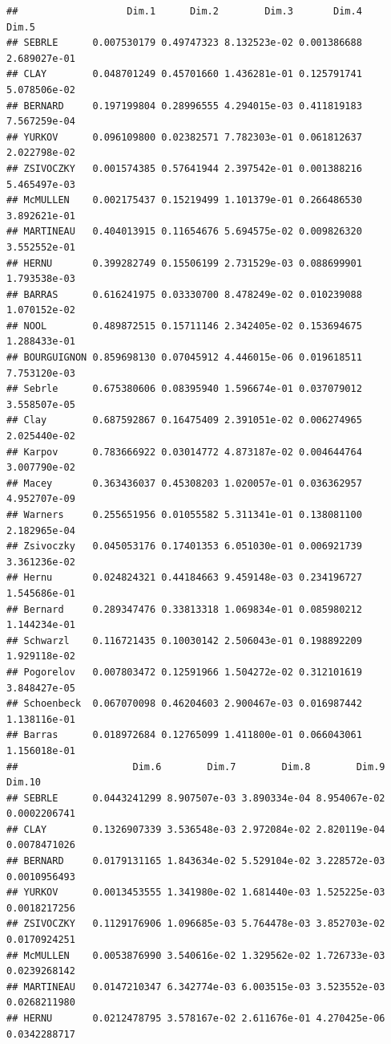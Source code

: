 \documentclass[
]{book}
\begin{document}
\begin{verbatim}
##                   Dim.1      Dim.2        Dim.3       Dim.4        Dim.5
## SEBRLE      0.007530179 0.49747323 8.132523e-02 0.001386688 2.689027e-01
## CLAY        0.048701249 0.45701660 1.436281e-01 0.125791741 5.078506e-02
## BERNARD     0.197199804 0.28996555 4.294015e-03 0.411819183 7.567259e-04
## YURKOV      0.096109800 0.02382571 7.782303e-01 0.061812637 2.022798e-02
## ZSIVOCZKY   0.001574385 0.57641944 2.397542e-01 0.001388216 5.465497e-03
## McMULLEN    0.002175437 0.15219499 1.101379e-01 0.266486530 3.892621e-01
## MARTINEAU   0.404013915 0.11654676 5.694575e-02 0.009826320 3.552552e-01
## HERNU       0.399282749 0.15506199 2.731529e-03 0.088699901 1.793538e-03
## BARRAS      0.616241975 0.03330700 8.478249e-02 0.010239088 1.070152e-02
## NOOL        0.489872515 0.15711146 2.342405e-02 0.153694675 1.288433e-01
## BOURGUIGNON 0.859698130 0.07045912 4.446015e-06 0.019618511 7.753120e-03
## Sebrle      0.675380606 0.08395940 1.596674e-01 0.037079012 3.558507e-05
## Clay        0.687592867 0.16475409 2.391051e-02 0.006274965 2.025440e-02
## Karpov      0.783666922 0.03014772 4.873187e-02 0.004644764 3.007790e-02
## Macey       0.363436037 0.45308203 1.020057e-01 0.036362957 4.952707e-09
## Warners     0.255651956 0.01055582 5.311341e-01 0.138081100 2.182965e-04
## Zsivoczky   0.045053176 0.17401353 6.051030e-01 0.006921739 3.361236e-02
## Hernu       0.024824321 0.44184663 9.459148e-03 0.234196727 1.545686e-01
## Bernard     0.289347476 0.33813318 1.069834e-01 0.085980212 1.144234e-01
## Schwarzl    0.116721435 0.10030142 2.506043e-01 0.198892209 1.929118e-02
## Pogorelov   0.007803472 0.12591966 1.504272e-02 0.312101619 3.848427e-05
## Schoenbeck  0.067070098 0.46204603 2.900467e-03 0.016987442 1.138116e-01
## Barras      0.018972684 0.12765099 1.411800e-01 0.066043061 1.156018e-01
##                    Dim.6        Dim.7        Dim.8        Dim.9       Dim.10
## SEBRLE      0.0443241299 8.907507e-03 3.890334e-04 8.954067e-02 0.0002206741
## CLAY        0.1326907339 3.536548e-03 2.972084e-02 2.820119e-04 0.0078471026
## BERNARD     0.0179131165 1.843634e-02 5.529104e-02 3.228572e-03 0.0010956493
## YURKOV      0.0013453555 1.341980e-02 1.681440e-03 1.525225e-03 0.0018217256
## ZSIVOCZKY   0.1129176906 1.096685e-03 5.764478e-03 3.852703e-02 0.0170924251
## McMULLEN    0.0053876990 3.540616e-02 1.329562e-02 1.726733e-03 0.0239268142
## MARTINEAU   0.0147210347 6.342774e-03 6.003515e-03 3.523552e-03 0.0268211980
## HERNU       0.0212478795 3.578167e-02 2.611676e-01 4.270425e-06 0.0342288717

\end{verbatim}
\end{document}
